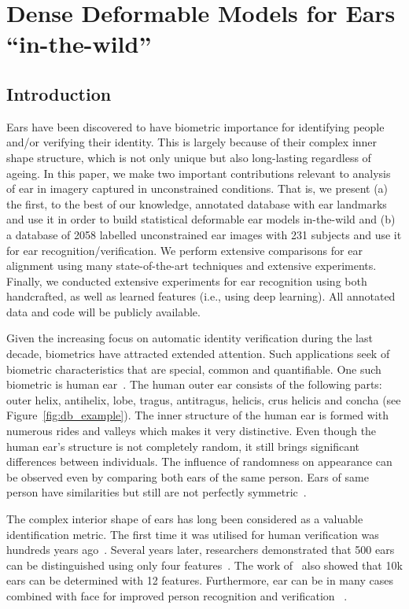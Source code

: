 \chapter{Dense Deformable Models for Ears ``in-the-wild''}
\minitoc

\section{Introduction}

Ears have been discovered to have  biometric importance for identifying people and/or verifying their identity. This is largely because of their complex inner shape structure, which is not only unique but also long-lasting regardless of ageing. In this paper, we make two important contributions relevant to analysis of ear in imagery captured in unconstrained conditions. That is, we present (a) the first, to the best of our knowledge, annotated database with ear landmarks and use it in order to build statistical deformable ear models in-the-wild and (b) a database of 2058 labelled unconstrained ear images with 231 subjects and use it for ear recognition/verification. We perform extensive comparisons for ear alignment using many state-of-the-art techniques and extensive experiments. Finally, we conducted extensive experiments for ear recognition using both handcrafted, as well as learned features (i.e., using deep learning). All annotated data and code will be publicly available. 

Given the increasing focus on automatic identity verification during the last decade, biometrics have attracted extended attention. Such applications seek of biometric characteristics that are special, common and quantifiable. One such biometric is human ear~\cite{chang2003comparison,chen2007human}. The human outer ear consists of the following parts: outer helix, antihelix, lobe, tragus, antitragus, helicis, crus helicis and concha (see Figure~\ref{fig:db_example}). The inner structure of the human ear is formed with numerous rides and valleys which makes it very distinctive. Even though the human ear's structure is not completely random, it still brings significant differences between individuals. The influence of randomness on appearance can be observed even by comparing both ears of the same person. Ears of same person have similarities but still are not perfectly symmetric~\cite{pflug2012ear}.

The complex interior shape of ears has long been considered as a valuable identification metric. The first time it was utilised for human verification was hundreds years ago~\cite{bertillon1890photographie}. Several years later, researchers demonstrated that 500 ears can be distinguished using only four features~\cite{imhofer1906bedeutung}. The work of~\cite{iannarelli1989ear} also showed that 10k ears can be determined with 12 features. Furthermore, ear can be in many cases combined with face for improved person recognition and verification ~\cite{chang2003comparison}.

